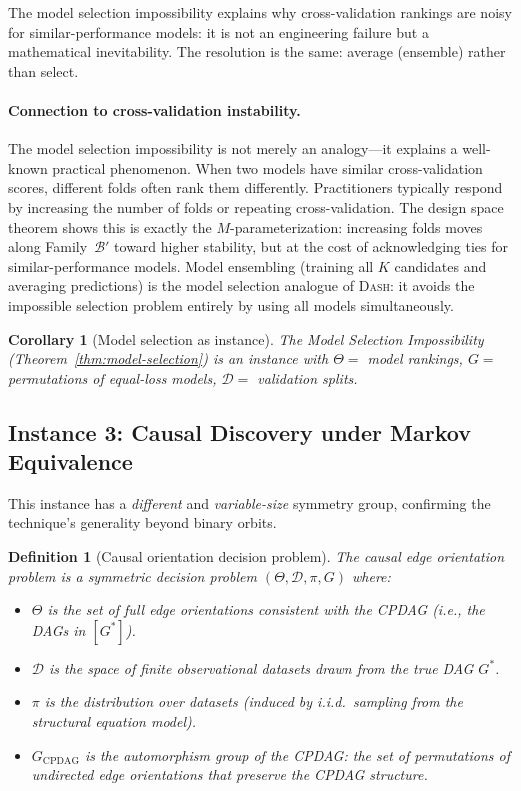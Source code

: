 \documentclass{article}
\newtheorem{corollary}[theorem]{Corollary}
\newtheorem{definition}[theorem]{Definition}
\newcommand{\DASH}{\textsc{Dash}}
\begin{document}
The model selection impossibility explains why cross-validation rankings are noisy for similar-performance models: it is not an engineering failure but a mathematical inevitability. The resolution is the same: average (ensemble) rather than select.

\paragraph{Connection to cross-validation instability.}
The model selection impossibility is not merely an analogy---it explains a well-known practical phenomenon. When two models have similar cross-validation scores, different folds often rank them differently. Practitioners typically respond by increasing the number of folds or repeating cross-validation. The design space theorem shows this is exactly the $M$-parameterization: increasing folds moves along Family~$\mathcal{B}'$ toward higher stability, but at the cost of acknowledging ties for similar-performance models. Model ensembling (training all $K$ candidates and averaging predictions) is the model selection analogue of \DASH{}: it avoids the impossible selection problem entirely by using all models simultaneously.

\begin{corollary}[Model selection as instance]
\label{cor:model-selection-instance}
The Model Selection Impossibility
(Theorem~\ref{thm:model-selection}) is an instance with
$\Theta =$ model rankings, $G =$ permutations of equal-loss models,
$\mathcal{D} =$ validation splits.
\end{corollary}

\subsection{Instance 3: Causal Discovery under Markov Equivalence}

This instance has a \emph{different} and \emph{variable-size} symmetry group, confirming the technique's generality beyond binary orbits.

\begin{definition}[Causal orientation decision problem]
The causal edge orientation problem is a symmetric decision problem $(\Theta, \mathcal{D}, \pi, G)$ where:
\begin{itemize}
    \item $\Theta$ is the set of full edge orientations consistent with the CPDAG (i.e., the DAGs in $[G^*]$).
    \item $\mathcal{D}$ is the space of finite observational datasets drawn from the true DAG $G^*$.
    \item $\pi$ is the distribution over datasets (induced by i.i.d.\ sampling from the structural equation model).
    \item $G_{\text{CPDAG}}$ is the \emph{automorphism group of the CPDAG}: the set of permutations of undirected edge orientations that preserve the CPDAG structure.
\end{itemize}
\end{definition}
\end{document}
